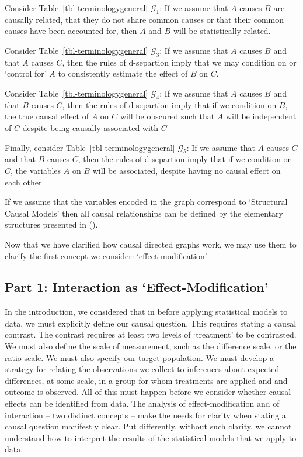 \documentclass[
  single column]{article}
\begin{document}
Consider Table~\ref{tbl-terminologygeneral} \(\mathcal{G}_1\): If we
assume that \(A\) causes \(B\) are causally related, that they do not
share common causes or that their common causes have been accounted for,
then \(A\) and \(B\) will be statistically related.

Consider Table~\ref{tbl-terminologygeneral} \(\mathcal{G}_3\): If we
assume that \(A\) causes \(B\) and that \(A\) causes \(C\), then the
rules of d-separtion imply that we may condition on or `control for'
\(A\) to consistently estimate the effect of \(B\) on \(C\).

Consider Table~\ref{tbl-terminologygeneral} \(\mathcal{G}_4\): If we
assume that \(A\) causes \(B\) and that \(B\) causes \(C\), then the
rules of d-separtion imply that if we condition on \(B\), the true
causal effect of \(A\) on \(C\) will be obscured such that \(A\) will be
independent of \(C\) despite being causally associated with \(C\)

Finally, consider Table~\ref{tbl-terminologygeneral} \(\mathcal{G}_5\):
If we assume that \(A\) causes \(C\) and that \(B\) causes \(C\), then
the rules of d-separtion imply that if we condition on \(C\), the
variables \(A\) on \(B\) will be associated, despite having no causal
effect on each other.

If we assume that the variables encoded in the graph correspond to
`Structural Causal Models' then all causal relationships can be defined
by the elementary structures presented in
().

Now that we have clarified how causal directed graphs work, we may use
them to clarify the first concept we consider: `effect-modification'

\newpage{}

\subsection{Part 1: Interaction as
`Effect-Modification'}\label{part-1-interaction-as-effect-modification}

In the introduction, we considered that in before applying statistical
models to data, we must explicitly define our causal question. This
requires stating a causal contrast. The contrast requires at least two
levels of `treatment' to be contrasted. We must also define the scale of
measurement, such as the difference scale, or the ratio scale. We must
also specify our target population. We must develop a strategy for
relating the observations we collect to inferences about expected
differences, at some scale, in a group for whom treatments are applied
and and outcome is observed. All of this must happen before we consider
whether causal effects can be identified from data. The analysis of
effect-modification and of interaction -- two distinct concepts -- make
the needs for clarity when stating a causal question manifestly clear.
Put differently, without such clarity, we cannot understand how to
interpret the results of the statistical models that we apply to data.
\end{document}
